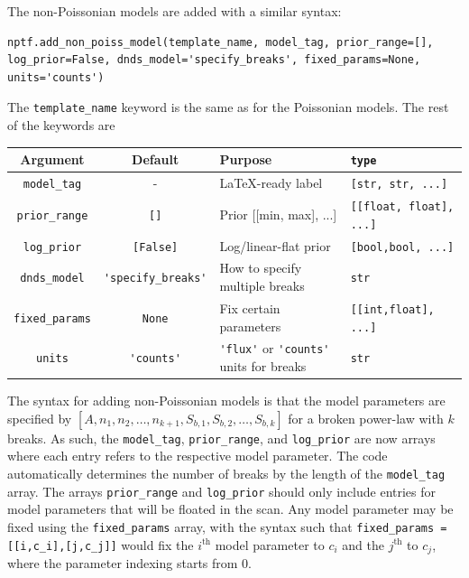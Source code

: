 The non-Poissonian models are added with a similar syntax:
\begin{lstlisting}
nptf.add_non_poiss_model(template_name, model_tag, prior_range=[], log_prior=False, dnds_model='specify_breaks', fixed_params=None, units='counts')
\end{lstlisting} 
The \lstinline{template_name} keyword is the same as for the Poissonian models.  The rest of the keywords are

\begin{center}
\renewcommand{\arraystretch}{1.4}
\begin{tabular}{ccC{4cm}C{4cm}}
\toprule
Argument &  Default & Purpose &\lstinline!type! \\ 
\midrule
\lstinline!model_tag! & - & \LaTeX-ready label & \lstinline![str, str, ...]! \\  
\lstinline!prior_range! & \lstinline![]! & Prior [[min, max], ...] & \lstinline![[float, float], ...]!  \\  
\lstinline!log_prior! & \lstinline![False]! & Log/linear-flat prior & \lstinline![bool,bool, ...]!  \\  
\lstinline!dnds_model! & \lstinline!'specify_breaks'! & How to specify multiple breaks & \lstinline!str!  \\  
\lstinline!fixed_params! & \lstinline!None! & Fix certain parameters & \lstinline![[int,float], ...]!  \\  
\lstinline!units! & \lstinline!'counts'! & \lstinline!'flux'! or \lstinline!'counts'! units for breaks  & \lstinline!str!  \\ 
\bottomrule
\end{tabular} 
\end{center}

The syntax for adding non-Poissonian models is that the model parameters are specified by $[A, n_1, n_2, \ldots, n_{k+1}, S_{b,1}, S_{b,2}, \ldots, S_{b,k}]$ for a broken power-law with $k$ breaks.  As such, the \lstinline{model_tag}, \lstinline{prior_range}, and \lstinline{log_prior} are now arrays where each entry refers to the respective model parameter.  The code automatically determines the number of breaks by the length of the \lstinline{model_tag} array.  The arrays \lstinline{prior_range} and \lstinline{log_prior} should only include entries for model parameters that will be floated in the scan.  Any model parameter may be fixed using the \lstinline{fixed_params} array, with the syntax such that \lstinline{fixed_params = [[i,c_i],[j,c_j]]} would fix the $i^\text{th}$ model parameter to $c_i$ and the $j^\text{th}$ to $c_j$, where the parameter indexing starts from 0.     

